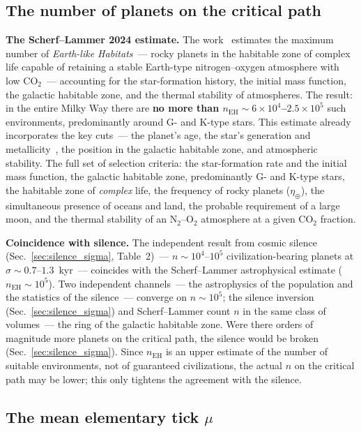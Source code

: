 \documentclass[11pt,a4paper]{article}
\begin{document}
\subsection{The number of planets on the critical path}
\label{sec:kepler}

\textbf{The Scherf--Lammer 2024 estimate.} The work~\cite{Scherf2024,Lammer2024} estimates the maximum number of \emph{Earth-like Habitats}~--- rocky planets in the habitable zone of complex life capable of retaining a stable Earth-type nitrogen--oxygen atmosphere with low $\mathrm{CO_2}$~--- accounting for the star-formation history, the initial mass function, the galactic habitable zone, and the thermal stability of atmospheres. The result: in the entire Milky Way there are \textbf{no more than $n_{\text{EH}} \sim 6\times10^4$--$2.5\times10^5$} such environments, predominantly around G- and K-type stars. This estimate already incorporates the key cuts~--- the planet's age, the star's generation and metallicity~\cite{Lineweaver2001,Behroozi2015}, the position in the galactic habitable zone, and atmospheric stability. The full set of selection criteria: the star-formation rate and the initial mass function, the galactic habitable zone, predominantly G- and K-type stars, the habitable zone of \emph{complex} life, the frequency of rocky planets ($\eta_\oplus$), the simultaneous presence of oceans and land, the probable requirement of a large moon, and the thermal stability of an N$_2$--O$_2$ atmosphere at a given CO$_2$ fraction.

\textbf{Coincidence with silence.} The independent result from cosmic silence (Sec.~\ref{sec:silence_sigma}, Table~2)~--- $n \sim 10^4$--$10^5$ civilization-bearing planets at $\sigma \sim 0.7$--$1.3$~kyr~--- coincides with the Scherf--Lammer astrophysical estimate ($n_{\text{EH}} \sim 10^5$). Two independent channels~--- the astrophysics of the population and the statistics of the silence~--- converge on $n \sim 10^5$; the silence inversion (Sec.~\ref{sec:silence_sigma}) and Scherf--Lammer count $n$ in the same class of volumes~--- the ring of the galactic habitable zone. Were there orders of magnitude more planets on the critical path, the silence would be broken (Sec.~\ref{sec:silence_sigma}). Since $n_{\text{EH}}$ is an upper estimate of the number of suitable environments, not of guaranteed civilizations, the actual $n$ on the critical path may be lower; this only tightens the agreement with the silence.

\subsection{The mean elementary tick \texorpdfstring{$\mu$}{μ}}
\label{sec:mu_from_sigma}
\end{document}
